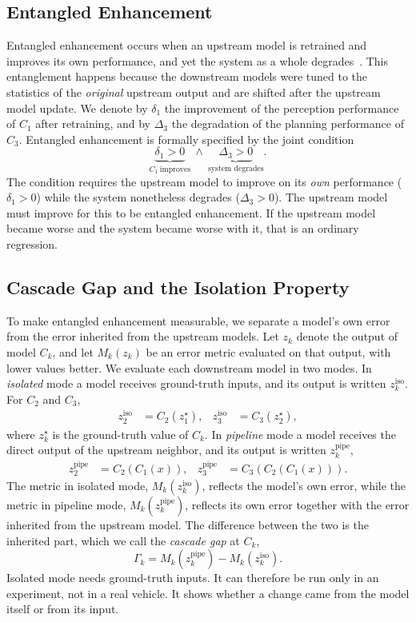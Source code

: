 \documentclass[conference]{IEEEtran}
\begin{document}
\subsection{Entangled Enhancement}
\label{sec:ee-def}
Entangled enhancement occurs when an upstream model is retrained and improves its own performance, and yet the system as a whole degrades~\cite{wang2024compsac}.
This entanglement happens because the downstream models were tuned to the
statistics of the \emph{original} upstream output and are shifted after the upstream model update. We denote by $\delta_1$ the improvement of the perception performance of
$C_1$ after retraining, and by $\Delta_3$ the
degradation of the planning performance of $C_3$. Entangled enhancement is formally specified by the joint condition
\begin{equation}
\underbrace{\delta_1 > 0}_{C_1\ \text{improves}}
\ \wedge\
\underbrace{\Delta_3 > 0}_{\text{system degrades}} .
\label{eq:ee}
\end{equation}
The condition requires the upstream model to improve on its \emph{own} performance
($\delta_1 > 0$) while the system nonetheless degrades ($\Delta_3 > 0$). The upstream model must improve for this to be entangled enhancement. If the upstream model became worse and the system became worse with it, that is an ordinary regression.

\subsection{Cascade Gap and the Isolation Property}
\label{sec:dualmode}
To make entangled enhancement measurable, we separate a model's own error from
the error inherited from the upstream models. Let $z_k$ denote the output of model $C_k$,
and let $M_k(z_k)$ be an error metric evaluated on that output, with lower values
better. We evaluate each downstream model in two modes. In \emph{isolated} mode a
model receives ground-truth inputs, and its output is written $z_k^{\text{iso}}$.
For $C_2$ and $C_3$,
\begin{align}
z_2^{\text{iso}} &= C_2(z_1^{\star}), &
z_3^{\text{iso}} &= C_3(z_2^{\star}),
\label{eq:iso-mode}
\end{align}
where $z_k^{\star}$ is the ground-truth value of $C_k$. In \emph{pipeline}
mode a model receives the direct output of the upstream neighbor, and its output is
written $z_k^{\text{pipe}}$,
\begin{align}
z_2^{\text{pipe}} &= C_2(C_1(x)), &
z_3^{\text{pipe}} &= C_3(C_2(C_1(x))).
\label{eq:pipe-mode}
\end{align}
The metric in isolated mode, $M_k(z_k^{\text{iso}})$, reflects the model's own
error, while the metric in pipeline mode, $M_k(z_k^{\text{pipe}})$, reflects its
own error together with the error inherited from the upstream model. The difference between
the two is the inherited part, which we call the \emph{cascade gap} at $C_k$,
\begin{equation}
\Gamma_k = M_k(z_k^{\text{pipe}}) - M_k(z_k^{\text{iso}}).
\label{eq:gap}
\end{equation}
Isolated mode needs ground-truth inputs. It can therefore be run only in an experiment, not in a real vehicle. It shows whether a change came from the model itself or from its input.
\end{document}
